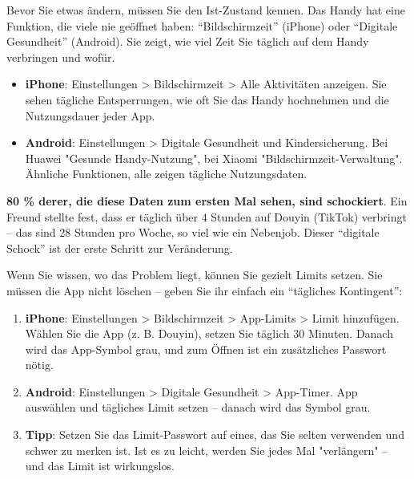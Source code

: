 


Bevor Sie etwas ändern, müssen Sie den Ist-Zustand kennen. Das Handy hat eine Funktion, die viele nie geöffnet haben: “Bildschirmzeit” (iPhone) oder “Digitale Gesundheit” (Android). Sie zeigt, wie viel Zeit Sie täglich auf dem Handy verbringen und wofür.

\begin{itemize}
  \item \textbf{iPhone}: Einstellungen > Bildschirmzeit > Alle Aktivitäten anzeigen. Sie sehen tägliche Entsperrungen, wie oft Sie das Handy hochnehmen und die Nutzungsdauer jeder App.
  \item \textbf{Android}: Einstellungen > Digitale Gesundheit und Kindersicherung. Bei Huawei "Gesunde Handy-Nutzung", bei Xiaomi "Bildschirmzeit-Verwaltung". Ähnliche Funktionen, alle zeigen tägliche Nutzungsdaten.
\end{itemize}

\textbf{80 \% derer, die diese Daten zum ersten Mal sehen, sind schockiert}. Ein Freund stellte fest, dass er täglich über 4 Stunden auf Douyin (TikTok) verbringt – das sind 28 Stunden pro Woche, so viel wie ein Nebenjob. Dieser “digitale Schock” ist der erste Schritt zur Veränderung.


Wenn Sie wissen, wo das Problem liegt, können Sie gezielt Limits setzen. Sie müssen die App nicht löschen – geben Sie ihr einfach ein “tägliches Kontingent”:

\begin{enumerate}
  \item \textbf{iPhone}: Einstellungen > Bildschirmzeit > App-Limits > Limit hinzufügen. Wählen Sie die App (z. B. Douyin), setzen Sie täglich 30 Minuten. Danach wird das App-Symbol grau, und zum Öffnen ist ein zusätzliches Passwort nötig.
  \item \textbf{Android}: Einstellungen > Digitale Gesundheit > App-Timer. App auswählen und tägliches Limit setzen – danach wird das Symbol grau.
  \item \textbf{Tipp}: Setzen Sie das Limit-Passwort auf eines, das Sie selten verwenden und schwer zu merken ist. Ist es zu leicht, werden Sie jedes Mal "verlängern" – und das Limit ist wirkungslos.
\end{enumerate}


